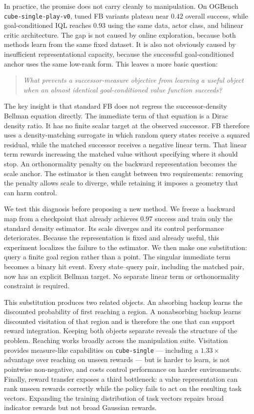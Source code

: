 \documentclass{article}
\begin{document}
In practice, the promise does not carry cleanly to manipulation. On OGBench
\texttt{cube-single-play-v0}, tuned FB variants plateau near $0.42$ overall
success, while goal-conditioned IQL reaches $0.93$ using the same data, actor
class, and bilinear critic architecture. The gap is not caused by online
exploration, because both methods learn from the same fixed dataset. It is also
not obviously caused by insufficient representational capacity, because the
successful goal-conditioned anchor uses the same low-rank form. This leaves a
more basic question:

\begin{quote}
\emph{What prevents a successor-measure objective from learning a useful object
when an almost identical goal-conditioned value function succeeds?}
\end{quote}

The key insight is that standard FB does not regress the successor-density
Bellman equation directly. The immediate term of that equation is a Dirac density
ratio. It has no finite scalar target at the observed successor. FB therefore uses
a density-matching surrogate in which random query states receive a squared
residual, while the matched successor receives a negative linear term. That
linear term rewards increasing the matched value without specifying where it
should stop. An orthonormality penalty on the backward representation becomes the
scale anchor. The estimator is then caught between two requirements: removing the
penalty allows scale to diverge, while retaining it imposes a geometry that can
harm control.

We test this diagnosis before proposing a new method. We freeze a backward map
from a checkpoint that already achieves $0.97$ success and train only the standard
density estimator. Its scale diverges and its control performance deteriorates.
Because the representation is fixed and already useful, this experiment localizes
the failure to the estimator. We then make one substitution: query a finite goal
region rather than a point. The singular immediate term becomes a binary hit
event. Every state--query pair, including the matched pair, now has an explicit
Bellman target. No separate linear term or orthonormality constraint is required.

This substitution produces two related objects. An absorbing backup learns the
discounted probability of first reaching a region. A nonabsorbing backup learns
discounted visitation of that region and is therefore the one that can support
reward integration. Keeping both objects separate reveals the structure of the
problem. Reaching works broadly across the manipulation suite. Visitation provides
measure-like capabilities on \texttt{cube-single} --- including a $1.33\times$
advantage over reaching on unseen rewards --- but is harder to learn, is not
pointwise non-negative, and costs control performance on harder environments.
Finally, reward transfer exposes a third bottleneck: a value representation can
rank unseen rewards correctly while the policy fails to act on the resulting task
vectors. Expanding the training distribution of task vectors repairs broad
indicator rewards but not broad Gaussian rewards.
\end{document}
